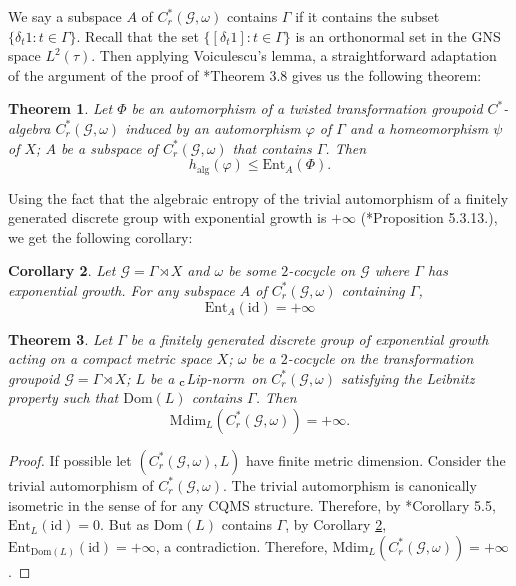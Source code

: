 \documentclass[a4paper,11pt,reqno]{amsart}
\theoremstyle{plain}
\newtheorem{thm}{Theorem}[section]
\newtheorem{cor}[thm]{Corollary}
\theoremstyle{mainthmstyle}
\theoremstyle{named}
\numberwithin{equation}{section}
\newcommand{\clipnorm}{$_{\text{\rm c}}$Lip-norm}
\begin{document}
We say a subspace $A$ of $C^{\ast}_{r}(\mathcal{G},\omega)$ contains $\Gamma$ if it contains the subset $\{\delta_{t}1:t\in\Gamma\}$. Recall that the set $\{[\delta_{t}1]:t\in\Gamma\}$ is an orthonormal set in the GNS space $L^{2}(\tau)$. Then applying Voiculescu's lemma, a straightforward adaptation of the argument of the proof of \cite{chattopadhyay2026metric}*{Theorem 3.8} gives us the following theorem: 

\begin{thm}
    \label{entropy_lowerbound}
    Let $\Phi$ be an automorphism of a twisted transformation groupoid $C^{\ast}$-algebra $C^{\ast}_{r}(\mathcal{G},\omega)$ induced by an automorphism $\varphi$ of $\Gamma$ and a homeomorphism $\psi$ of $X$; $A$ be a subspace of $C^{\ast}_{r}(\mathcal{G},\omega)$ that contains $\Gamma$. Then
    \begin{displaymath}
        h_{\mathrm{alg}}(\varphi)\leq \mathrm{Ent}_{A}(\Phi).
    \end{displaymath}
\end{thm}
Using the fact that the algebraic entropy of the trivial automorphism of a finitely generated discrete group with exponential growth is $+\infty$ (\cite{Dikranjan2013TopologicalEA}*{Proposition 5.3.13.}), we get the following corollary:
\begin{cor}
\label{infinityentropy}
   Let $\mathcal{G}=\Gamma\rtimes X$ and $\omega$ be some $2$-cocycle on $\mathcal{G}$ where $\Gamma$ has exponential growth. For any subspace $A$ of $C^{\ast}_{r}(\mathcal{G},\omega)$ containing $\Gamma$, 
    \begin{displaymath}\mathrm{Ent}_{A}(\mathrm{id})=+\infty\end{displaymath}
\end{cor}
\begin{thm}
    \label{infinity_Mdim}
    Let $\Gamma$ be a finitely generated discrete group of exponential growth acting on a compact metric space $X$; $\omega$ be a $2$-cocycle on the transformation groupoid $\mathcal{G}=\Gamma\rtimes X$; $L$ be a \clipnorm\ on $C^{\ast}_{r}(\mathcal{G},\omega)$ satisfying the Leibnitz property such that $\mathrm{Dom}(L)$ contains $\Gamma$. Then
    \begin{displaymath}
        \mathrm{Mdim}_{L}(C^{\ast}_{r}(\mathcal{G},\omega))=+\infty.
    \end{displaymath}
\end{thm}
\begin{proof}
   If possible let $(C^{\ast}_{r}(\mathcal{G},\omega),L)$ have finite metric dimension. Consider the trivial automorphism of $C^{\ast}_{r}(\mathcal{G},\omega)$. The trivial automorphism is canonically isometric in the sense of \cite{Kerr} for any CQMS structure. Therefore, by \cite{Kerr}*{Corollary 5.5}, $\mathrm{Ent}_{L}(\mathrm{id})=0$. But as $\mathrm{Dom}(L)$ contains $\Gamma$, by Corollary \ref{infinityentropy}, $\mathrm{Ent}_{\mathrm{Dom}(L)}(\mathrm{id})=+\infty$, a contradiction. Therefore, $\mathrm{Mdim}_{L}(C^{\ast}_{r}(\mathcal{G},\omega))=+\infty$.   
\end{proof}
\end{document}
